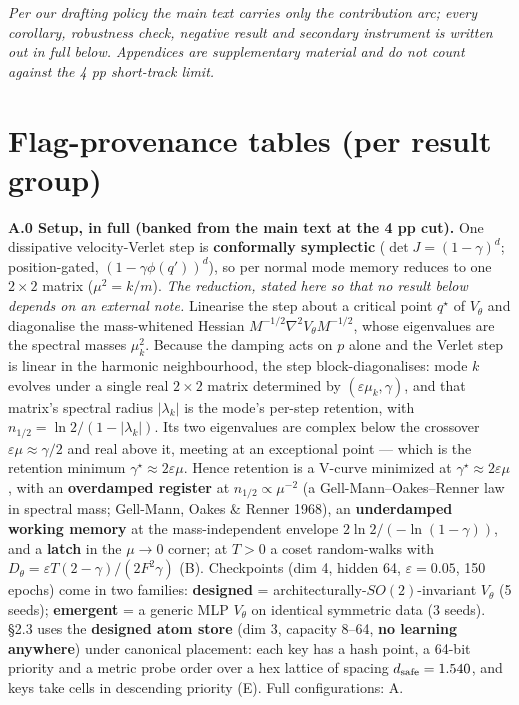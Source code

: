 \documentclass{article}
\begin{document}
\appendix



\emph{Per our drafting policy the main text carries only the contribution arc; every corollary, robustness check, negative result and secondary instrument is written out in full below. Appendices are supplementary material and do not count against the 4 pp short-track limit.}

\section{Flag-provenance tables (per result group)}

\textbf{A.0 Setup, in full (banked from the main text at the 4 pp cut).} One dissipative velocity-Verlet step is \textbf{conformally symplectic} ($\det J=(1-\gamma)^d$; position-gated, $(1-\gamma\phi(q'))^d$), so per normal mode memory reduces to one $2\times2$ matrix ($\mu^2=k/m$). \emph{The reduction, stated here so that no result below depends on an external note.} Linearise the step about a critical point $q^\star$ of $V_\theta$ and diagonalise the mass-whitened Hessian $M^{-1/2}\nabla^2V_\theta M^{-1/2}$, whose eigenvalues are the spectral masses $\mu_k^2$. Because the damping acts on $p$ alone and the Verlet step is linear in the harmonic neighbourhood, the step block-diagonalises: mode $k$ evolves under a single real $2\times2$ matrix determined by $(\varepsilon\mu_k,\gamma)$, and that matrix's spectral radius $|\lambda_k|$ is the mode's per-step retention, with $n_{1/2}=\ln2/(1-|\lambda_k|)$. Its two eigenvalues are complex below the crossover $\varepsilon\mu\approx\gamma/2$ and real above it, meeting at an exceptional point --- which is the retention minimum $\gamma^\star\approx2\varepsilon\mu$. Hence retention is a V-curve minimized at $\gamma^\star\approx2\varepsilon\mu$, with an \textbf{overdamped register} at $n_{1/2}\propto\mu^{-2}$ (a Gell-Mann--Oakes--Renner law in spectral mass; Gell-Mann, Oakes \& Renner 1968), an \textbf{underdamped working memory} at the mass-independent envelope $2\ln2/(-\ln(1-\gamma))$, and a \textbf{latch} in the $\mu\to0$ corner; at $T>0$ a coset random-walks with $D_\theta=\varepsilon T(2-\gamma)/(2F^2\gamma)$ (B). Checkpoints (dim 4, hidden 64, $\varepsilon=0.05$, 150 epochs) come in two families: \textbf{designed} = architecturally-$SO(2)$-invariant $V_\theta$ (5 seeds); \textbf{emergent} = a generic MLP $V_\theta$ on identical symmetric data (3 seeds). \S 2.3 uses the \textbf{designed atom store} (dim 3, capacity 8--64, \textbf{no learning anywhere}) under canonical placement: each key has a hash point, a 64-bit priority and a metric probe order over a hex lattice of spacing $d_{\rm safe}=1.540$, and keys take cells in descending priority (E). Full configurations: A.
\end{document}
